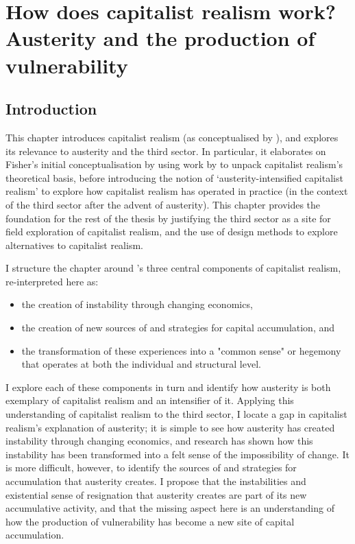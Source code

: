 \chapter{How does capitalist realism work? Austerity and the production of vulnerability}
\label{ch:2}

\section{Introduction}
\label{sec:2-intro}

This chapter introduces capitalist realism (as conceptualised by \citet{fisher_capitalist_2009}), and explores its relevance to austerity and the third sector. In particular, it elaborates on Fisher's initial conceptualisation by using work by \citet{shonkwiler_reading_2014} to unpack capitalist realism's theoretical basis, before introducing the notion of `austerity-intensified capitalist realism' to explore how capitalist realism has operated in practice (in the context of the third sector after the advent of austerity). This chapter provides the foundation for the rest of the thesis by justifying the third sector as a site for field exploration of capitalist realism, and the use of design methods to explore alternatives to capitalist realism. 

I structure the chapter around \citet{shonkwiler_reading_2014}'s three central components of capitalist realism, re-interpreted here as:
\begin{itemize}
    \item  the creation of instability through changing economics, 
    \item the creation of new sources of and strategies for capital accumulation, and 
    \item the transformation of these experiences into a "common sense" or hegemony that operates at both the individual and structural level. 
\end{itemize}

I explore each of these components in turn and identify how austerity is both exemplary of capitalist realism and an intensifier of it. Applying this understanding of capitalist realism to the third sector, I locate a gap in capitalist realism's explanation of austerity; it is simple to see how austerity has created instability through changing economics, and research has shown how this instability has been transformed into a felt sense of the impossibility of change. It is more difficult, however, to identify the sources of and strategies for accumulation that austerity creates. I propose that the instabilities and existential sense of resignation that austerity creates are part of its new accumulative activity, and that the missing aspect here is an understanding of how the production of vulnerability has become a new site of capital accumulation.

